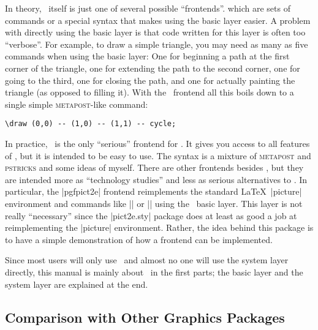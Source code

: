 In theory, \tikzname\ itself is just one of several possible ``frontends''.
which are sets of commands or a special syntax that makes using the basic layer
easier. A problem with directly using the basic layer is that code written for
this layer is often too ``verbose''. For example, to draw a simple triangle,
you may need as many as five commands when using the basic layer: One for
beginning a path at the first corner of the triangle, one for extending the
path to the second corner, one for going to the third, one for closing the
path, and one for actually painting the triangle (as opposed to filling it).
With the \tikzname\ frontend all this boils down to a single simple
\textsc{metapost}-like command:
%
\begin{verbatim}
\draw (0,0) -- (1,0) -- (1,1) -- cycle;
\end{verbatim}

In practice, \tikzname\ is the only ``serious'' frontend for \pgfname. It gives
you access to all features of \pgfname, but it is intended to be easy to use.
The syntax is a mixture of \textsc{metapost} and \textsc{pstricks} and some
ideas of myself. There are other frontends besides \tikzname, but they are intended
more as ``technology studies'' and less as serious alternatives to
\tikzname. In particular, the |pgfpict2e| frontend   reimplements the standard
\LaTeX\ |{picture}|  environment and commands like |\line| or |\vector| using
the \pgfname\ basic layer. This layer is not really ``necessary'' since the
|pict2e.sty| package does at least as good a job at reimplementing the
|{picture}| environment. Rather, the idea behind this package is to have a
simple demonstration of how a frontend can be implemented.

Since most users will only use \tikzname\ and almost no one will use the system
layer directly, this manual is mainly about \tikzname\ in the first parts; the
basic layer and the system layer are explained at the end.


\subsection{Comparison with Other Graphics Packages}

